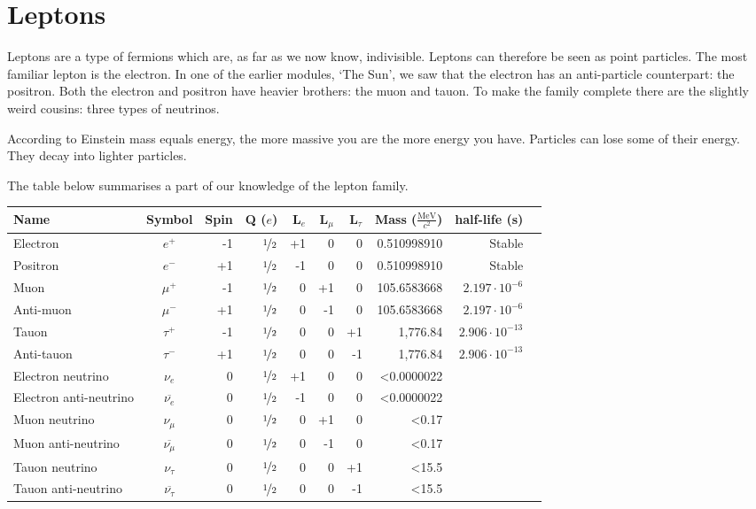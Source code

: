 \section{Leptons}
Leptons are a type of fermions which are, as far as we now know, indivisible. Leptons can therefore be seen as point particles. The most familiar lepton is the electron. In one of the earlier modules, `The Sun', we saw that the electron has an anti-particle counterpart: the positron. Both the electron and positron have heavier brothers: the muon and tauon. To make the family complete there are the slightly weird cousins: three types of neutrinos.

According to Einstein mass equals energy, the more massive you are the more energy you have. Particles can lose some of their energy. They decay into lighter particles.

The table below summarises a part of our knowledge of the lepton family.

\begin{center}\begin{small}
\begin{tabular}[h]{l c r r r r r r r r} 
Name & Symbol & Spin & Q ($e$) & L$_e$ & L$_{\mu}$  & L$_{\tau}$  & Mass ($\frac{\mbox{MeV}}{c^2}$) & half-life (s) \\ \hline \hline
Electron & $e^+$ & -1 & $\nicefrac{1}{2}$ & +1 & 0 & 0 & 0.510998910 & Stable \\ 
Positron & $e^-$ & +1 & $\nicefrac{1}{2}$ & -1 & 0 & 0 & 0.510998910 & Stable \\ \hline
Muon & $\mu^+$ & -1 & $\nicefrac{1}{2}$ & 0 & +1 & 0 & 105.6583668 &  $2.197 \cdot 10^{-6}$ \\ 
Anti-muon & $\mu^-$ & +1 & $\nicefrac{1}{2}$ & 0 & -1 & 0 & 105.6583668 & $2.197 \cdot 10^{-6}$ \\ \hline
Tauon & $\tau^+$ & -1 & $\nicefrac{1}{2}$ & 0 & 0 & +1 & 1,776.84 & $2.906 \cdot 10^{-13}$ \\ 
Anti-tauon & $\tau^-$ & +1 & $\nicefrac{1}{2}$ & 0 & 0 & -1 & 1,776.84 &  $2.906 \cdot 10^{-13}$ \\ \hline
Electron neutrino & $\nu_e$ & 0 & $\nicefrac{1}{2}$ & +1 & 0 & 0 & \textless 0.0000022 &  \\ 
Electron anti-neutrino & $\overline{\nu_e}$ & 0 & $\nicefrac{1}{2}$ & -1 & 0 & 0 & \textless 0.0000022 &  \\ \hline
Muon neutrino & $\nu_{\mu}$ & 0 & $\nicefrac{1}{2}$ & 0 & +1 & 0 & \textless 0.17 &  \\ 
Muon anti-neutrino & $\overline{\nu_{\mu}}$ & 0 & $\nicefrac{1}{2}$ & 0 & -1 & 0 & \textless 0.17 &  \\ \hline
Tauon neutrino & $\nu_{\tau}$ & 0 & $\nicefrac{1}{2}$ & 0 & 0 & +1 & \textless 15.5 &  \\ 
Tauon anti-neutrino & $\overline{\nu_{\tau}}$ & 0 & $\nicefrac{1}{2}$ & 0 & 0 & -1 & \textless 15.5 &  \\ \hline
\end{tabular}\end{small}
\label{tab:leptons}
\end{center}

